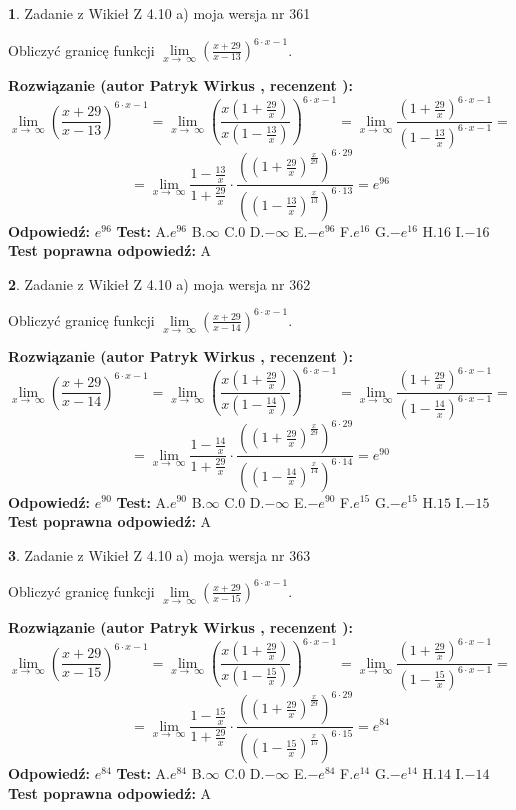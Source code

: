 \documentclass[12pt, a4paper]{article}
\theoremstyle{definition} %
\newtheorem{zad}{}
\newcommand{\zadStart}[1]{\begin{zad}#1\newline}
\newcommand{\zadStop}{\end{zad}}
\newcommand{\rozwStart}[2]{\noindent \textbf{Rozwiązanie (autor #1 , recenzent #2): }\newline}
\newcommand{\rozwStop}{\newline}
\newcommand{\odpStart}{\noindent \textbf{Odpowiedź:}\newline}
\newcommand{\odpStop}{\newline}
\newcommand{\testStart}{\noindent \textbf{Test:}\newline}
\newcommand{\testStop}{\newline}
\newcommand{\kluczStart}{\noindent \textbf{Test poprawna odpowiedź:}\newline}
\newcommand{\kluczStop}{\newline}
\begin{document}
\zadStart{Zadanie z Wikieł Z 4.10 a) moja wersja nr 361}

Obliczyć granicę funkcji  $\lim\limits_{x\to\ \infty}(\frac{x+29}{x-13})^{6\cdot x-1}$.
\zadStop
\rozwStart{Patryk Wirkus}{}
$$\lim\limits_{x\to\ \infty}(\frac{x+29}{x-13})^{6\cdot x-1} = \lim\limits_{x\to\ \infty}(\frac{x(1+\frac{29}{x})}{x(1-\frac{13}{x})})^{6\cdot x-1}=\lim\limits_{x\to\ \infty}\frac{(1+\frac{29}{x})^{6\cdot x-1}}{(1-\frac{13}{x})^{6\cdot x-1}}=$$
$$=\lim\limits_{x\to\ \infty}\frac{1-\frac{13}{x}}{1+\frac{29}{x}}\cdot\frac{((1+\frac{29}{x})^{\frac{x}{29}})^{6\cdot29}}{((1-\frac{13}{x})^{\frac{x}{13}})^{6\cdot13}}=e^{96}$$
\rozwStop
\odpStart
$e^{96}$
\odpStop
\testStart
A.$e^{96}$ B.$\infty$ C.$0$ D.$-\infty$ E.$-e^{96}$
F.$e^{16}$ G.$-e^{16}$
H.$16$
I.$-16$
\testStop
\kluczStart
A
\kluczStop



\zadStart{Zadanie z Wikieł Z 4.10 a) moja wersja nr 362}

Obliczyć granicę funkcji  $\lim\limits_{x\to\ \infty}(\frac{x+29}{x-14})^{6\cdot x-1}$.
\zadStop
\rozwStart{Patryk Wirkus}{}
$$\lim\limits_{x\to\ \infty}(\frac{x+29}{x-14})^{6\cdot x-1} = \lim\limits_{x\to\ \infty}(\frac{x(1+\frac{29}{x})}{x(1-\frac{14}{x})})^{6\cdot x-1}=\lim\limits_{x\to\ \infty}\frac{(1+\frac{29}{x})^{6\cdot x-1}}{(1-\frac{14}{x})^{6\cdot x-1}}=$$
$$=\lim\limits_{x\to\ \infty}\frac{1-\frac{14}{x}}{1+\frac{29}{x}}\cdot\frac{((1+\frac{29}{x})^{\frac{x}{29}})^{6\cdot29}}{((1-\frac{14}{x})^{\frac{x}{14}})^{6\cdot14}}=e^{90}$$
\rozwStop
\odpStart
$e^{90}$
\odpStop
\testStart
A.$e^{90}$ B.$\infty$ C.$0$ D.$-\infty$ E.$-e^{90}$
F.$e^{15}$ G.$-e^{15}$
H.$15$
I.$-15$
\testStop
\kluczStart
A
\kluczStop



\zadStart{Zadanie z Wikieł Z 4.10 a) moja wersja nr 363}

Obliczyć granicę funkcji  $\lim\limits_{x\to\ \infty}(\frac{x+29}{x-15})^{6\cdot x-1}$.
\zadStop
\rozwStart{Patryk Wirkus}{}
$$\lim\limits_{x\to\ \infty}(\frac{x+29}{x-15})^{6\cdot x-1} = \lim\limits_{x\to\ \infty}(\frac{x(1+\frac{29}{x})}{x(1-\frac{15}{x})})^{6\cdot x-1}=\lim\limits_{x\to\ \infty}\frac{(1+\frac{29}{x})^{6\cdot x-1}}{(1-\frac{15}{x})^{6\cdot x-1}}=$$
$$=\lim\limits_{x\to\ \infty}\frac{1-\frac{15}{x}}{1+\frac{29}{x}}\cdot\frac{((1+\frac{29}{x})^{\frac{x}{29}})^{6\cdot29}}{((1-\frac{15}{x})^{\frac{x}{15}})^{6\cdot15}}=e^{84}$$
\rozwStop
\odpStart
$e^{84}$
\odpStop
\testStart
A.$e^{84}$ B.$\infty$ C.$0$ D.$-\infty$ E.$-e^{84}$
F.$e^{14}$ G.$-e^{14}$
H.$14$
I.$-14$
\testStop
\kluczStart
A
\kluczStop
\end{document}
